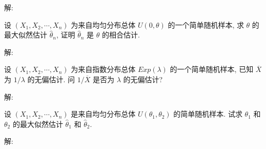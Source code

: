 \documentclass[standard]{ExBook}
\begin{document}
\begin{qitems}
    \begin{bbox}
解: 
    \end{bbox}

\vspace{-5em}

    \begin{bbox}
    \begin{shaded}
        \qitem
设 \((X_1, X_2, \cdots, X_n)\) 为来自均匀分布总体 \(U(0, \theta)\) 的一个简单随机样本, 求 \(\theta\) 的最大似然估计 \(\hat{\theta}_n\), 证明 \(\hat{\theta}_n\) 是 \(\theta\) 的相合估计.
    \end{shaded}
    \end{bbox}

\vspace{-5em}

    \begin{bbox}
解: 
    \end{bbox}

\vspace{-5em}

    \begin{bbox}
    \begin{shaded}
        \qitem
设 \((X_1, X_2, \cdots, X_n)\) 为来自指数分布总体 \(Exp(\lambda)\) 的一个简单随机样本, 已知 \(\overline{X}\) 为 \(1 \big/ \lambda\) 的无偏估计. 问 \(1 \big/ \overline{X}\) 是否为 \(\lambda\) 的无偏估计?
    \end{shaded}
    \end{bbox}

\vspace{-5em}

    \begin{bbox}
解: 
    \end{bbox}

\vspace{-5em}

    \begin{bbox}
    \begin{shaded}
        \qitem
设 \((X_1, X_2, \cdots, X_n)\) 是来自均匀分布总体 \(U(\theta_1, \theta_2)\) 的简单随机样本. 试求 \(\theta_1\) 和 \(\theta_2\) 的最大似然估计 \(\hat{\theta}_1\) 和 \(\hat{\theta}_2\).
    \end{shaded}
    \end{bbox}

\vspace{-5em}

    \begin{bbox}
解: 
    \end{bbox}


\end{qitems}
\end{document}
